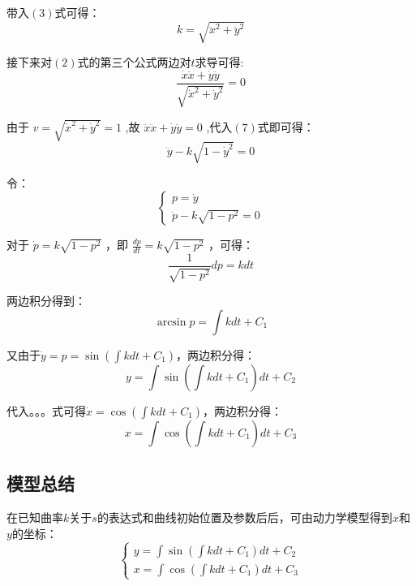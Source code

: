 \documentclass[withoutpreface,bwprint]{cumcmthesis}
\begin{document}
带入$(3)$式可得：
\begin{equation}
k=\sqrt{\ddot{x}^2+\ddot{y}^2}
\end{equation}

接下来对$(2)$式的第三个公式两边对$t$求导可得:
\begin{equation}
\frac{\dot{x} \ddot{x}+\dot{y} \ddot{y}}{\sqrt{\dot{x}^2+\dot{y}^2}}=0
\end{equation}

由于 $v=\sqrt{\dot{x}^2+\dot{y}^2}=1$ ,故 $\ddot{x} \ddot{x}+\dot{y} \ddot{y}=0$ ,代入$(7)$式即可得：
\begin{equation}
\ddot{y}-k \sqrt{1-\dot{y}^2}=0
\end{equation}

令：
\begin{equation}
\left\{\begin{array}{l}
p=\dot{y} \\
\dot{p}-k \sqrt{1-p^2}=0
\end{array}\right.
\end{equation}

对于 $\dot{p}=k \sqrt{1-p^2}$ ，即 $\frac{d p}{d t}=k \sqrt{1-p^2}$ ，可得：
\begin{equation}
\frac{1}{\sqrt{1-p^2}} d p=k d t
\end{equation}

两边积分得到：
\begin{equation}
\arcsin p=\int k d t+C_1
\end{equation}

又由于$\dot{y}=p=\sin \left(\int k d t+C_1\right)$，两边积分得：
\begin{equation}
y=\int \sin \left(\int k d t+C_1\right) d t+C_2
\end{equation}

代入。。。式可得$\dot{x}=\cos \left(\int k d t+C_1\right)$，两边积分得：
\begin{equation}
x=\int \cos \left(\int k d t+C_1\right) d t+C_3
\end{equation}

\subsection{模型总结}
在已知曲率$k$关于$s$的表达式和曲线初始位置及参数后后，可由动力学模型得到$x$和$y$的坐标：
\begin{equation}
\left\{\begin{array}{l}
y=\int \sin \left(\int k d t+C_1\right) d t+C_2 \\
x=\int \cos \left(\int k d t+C_1\right) d t+C_3
\end{array}\right.
\end{equation}
\end{document}
